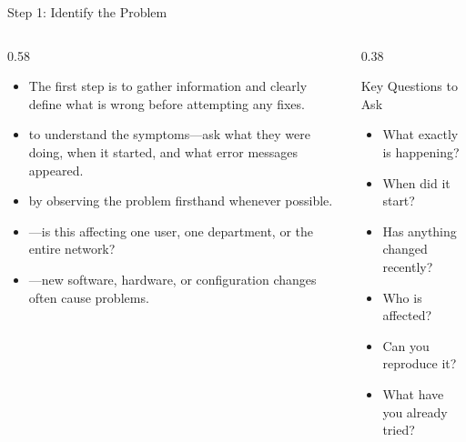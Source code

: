 \documentclass[aspectratio=169]{beamer}  %
\begin{document}
\begin{frame}{Step 1: Identify the Problem}
    \begin{columns}[T]
        \begin{column}{0.58\textwidth}
            \begin{itemize}
                \item The first step is to gather information and clearly define what is wrong before attempting any fixes.
                \item {} to understand the symptoms---ask what they were doing, when it started, and what error messages appeared.
                \item {} by observing the problem firsthand whenever possible.
                \item {}---is this affecting one user, one department, or the entire network?
                \item {}---new software, hardware, or configuration changes often cause problems.
            \end{itemize}
        \end{column}
        \begin{column}{0.38\textwidth}
            \begin{block}{Key Questions to Ask}
                \begin{itemize}
                    \item What exactly is happening?
                    \item When did it start?
                    \item Has anything changed recently?
                    \item Who is affected?
                    \item Can you reproduce it?
                    \item What have you already tried?
                \end{itemize}
            \end{block}
        \end{column}
    \end{columns}
\end{frame}
\end{document}
